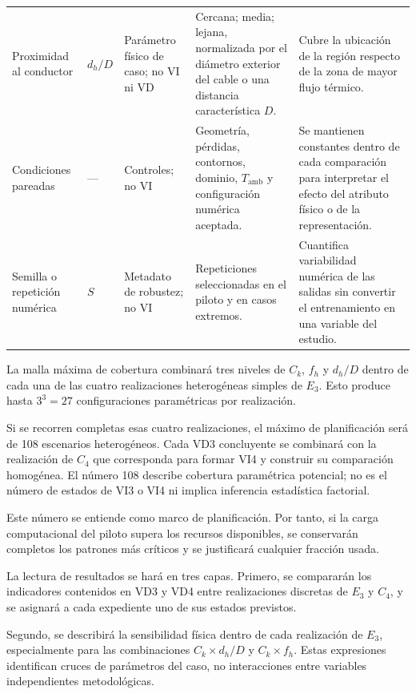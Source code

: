 \documentclass[11pt,a4paper,oneside]{report}
\newcommand{\tesisbodyfont}{\fontsize{11}{13.6}\selectfont}
\begin{document}
\begin{singlespace}
\begin{landscape}
\begin{longtable}{L{3.10cm}L{1.45cm}L{3.00cm}L{5.15cm}L{5.25cm}}
Proximidad al conductor & $d_h/D$ & Parámetro físico de caso; no VI ni VD & Cercana; media; lejana, normalizada por el diámetro exterior del cable o una distancia característica $D$. & Cubre la ubicación de la región respecto de la zona de mayor flujo térmico. \\

Condiciones pareadas & --- & Controles; no VI & Geometría, pérdidas, contornos, dominio, $T_{\mathrm{amb}}$ y configuración numérica aceptada. & Se mantienen constantes dentro de cada comparación para interpretar el efecto del atributo físico o de la representación. \\

Semilla o repetición numérica & $S$ & Metadato de robustez; no VI & Repeticiones seleccionadas en el piloto y en casos extremos. & Cuantifica variabilidad numérica de las salidas sin convertir el entrenamiento en una variable del estudio. \\

\end{longtable}

\tesisbodyfont

La malla máxima de cobertura combinará tres niveles de $C_k$, $f_h$ y $d_h/D$ dentro de cada una de las cuatro realizaciones heterogéneas simples de $E_3$. Esto produce hasta $3^3=27$ configuraciones paramétricas por realización.

Si se recorren completas esas cuatro realizaciones, el máximo de planificación será de 108 escenarios heterogéneos. Cada VD3 concluyente se combinará con la realización de $C_4$ que corresponda para formar VI4 y construir su comparación homogénea. El número 108 describe cobertura paramétrica potencial; no es el número de estados de VI3 o VI4 ni implica inferencia estadística factorial.

Este número se entiende como marco de planificación. Por tanto, si la carga computacional del piloto supera los recursos disponibles, se conservarán completos los patrones más críticos y se justificará cualquier fracción usada.

La lectura de resultados se hará en tres capas. Primero, se compararán los indicadores contenidos en VD3 y VD4 entre realizaciones discretas de $E_3$ y $C_4$, y se asignará a cada expediente uno de sus estados previstos.

Segundo, se describirá la sensibilidad física dentro de cada realización de $E_3$, especialmente para las combinaciones $C_k\times d_h/D$ y $C_k\times f_h$. Estas expresiones identifican cruces de parámetros del caso, no interacciones entre variables independientes metodológicas.


\end{landscape}
\end{singlespace}
\end{document}

